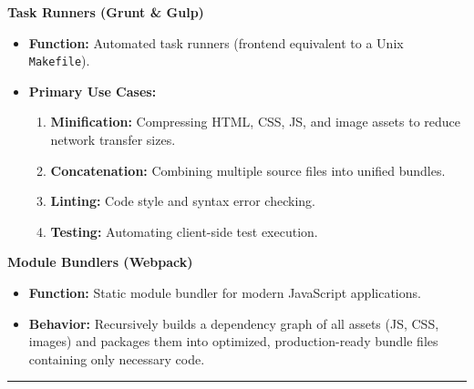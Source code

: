 \documentclass[8pt, a4paper]{article}
\begin{document}
\begin{conceptbox}
\textbf{Task Runners (Grunt \& Gulp)}
\begin{itemize}
  \item \textbf{Function:} Automated task runners (frontend equivalent to a Unix \texttt{Makefile}).
  \item \textbf{Primary Use Cases:}
    \begin{enumerate}
      \item \textbf{Minification:} Compressing HTML, CSS, JS, and image assets to reduce network transfer sizes.
      \item \textbf{Concatenation:} Combining multiple source files into unified bundles.
      \item \textbf{Linting:} Code style and syntax error checking.
      \item \textbf{Testing:} Automating client-side test execution.
    \end{enumerate}
\end{itemize}
\end{conceptbox}

\begin{conceptbox}
\textbf{Module Bundlers (Webpack)}
\begin{itemize}
  \item \textbf{Function:} Static module bundler for modern JavaScript applications.
  \item \textbf{Behavior:} Recursively builds a dependency graph of all assets (JS, CSS, images) and packages
        them into optimized, production-ready bundle files containing only necessary code.
\end{itemize}
\end{conceptbox}

\vspace{14pt}
\textcolor{rulegray}{\rule{\linewidth}{1pt}}
\end{document}
